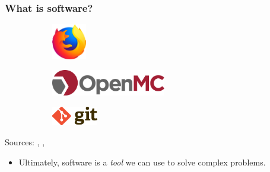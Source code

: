 \begin{frame}
  \frametitle{What is software?}
  \begin{figure}[htpb]
      \centering
      \begin{subfigure}
        \centering
        \includegraphics[width=1.5cm]{images/firefox-logo.png}
      \end{subfigure}
      \begin{subfigure}
        \centering
        \includegraphics[width=5cm]{images/openmc-logo.png}
      \end{subfigure}
      \begin{subfigure}
        \centering
        \includegraphics[width=2cm]{images/git-logo.png}
      \end{subfigure}
  \end{figure}
  \begin{center}
    {\tiny Sources: \cite{firefox_logo}, \cite{openmc_logo}, \cite{git_logo}}
  \end{center}
  \pause\medskip
  \begin{itemize}
      \item Ultimately, software is a {\it tool} we can use to solve complex problems.
  \end{itemize}
\end{frame}

